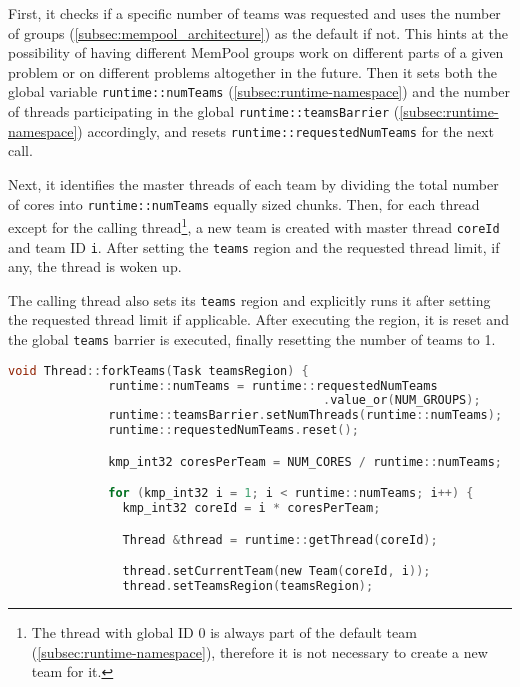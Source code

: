 \begin{itemize}
	      First, it checks if a specific number of teams was requested and uses the number of groups
	      (\cref{subsec:mempool_architecture}) as the default if not. This hints at the possibility
	      of having different MemPool groups work on different parts of a given problem or on
	      different problems altogether in the future. Then it sets both the global variable
	      \texttt{runtime::numTeams} (\cref{subsec:runtime-namespace}) and the number of threads
	      participating in the global \texttt{runtime::teamsBarrier}
	      (\cref{subsec:runtime-namespace}) accordingly, and resets
	      \texttt{runtime::requestedNumTeams} for the next call.

	      Next, it identifies the master threads of each team by dividing the total number of cores
	      into \texttt{runtime::numTeams} equally sized chunks. Then, for each thread except for the
	      calling thread\footnote{The thread with global ID 0 is always part of the default team
		      (\cref{subsec:runtime-namespace}), therefore it is not necessary to create a new team
		      for it.}, a new team is created with master thread \texttt{coreId} and team ID \texttt{i}.
	      After setting the \texttt{teams} region and the requested thread limit, if any, the thread
	      is woken up.

	      The calling thread also sets its \texttt{teams} region and explicitly runs it after
	      setting the requested thread limit if applicable. After executing the region, it is reset
	      and the global \texttt{teams} barrier is executed, finally resetting the number of teams
	      to 1.

	      \begin{lstlisting}[language=C, caption={void Thread::forkTeams},
          label={lst:thread-forkTeams},
          escapechar=@]
            void Thread::forkTeams(Task teamsRegion) {
              runtime::numTeams = runtime::requestedNumTeams
                                            .value_or(NUM_GROUPS);
              runtime::teamsBarrier.setNumThreads(runtime::numTeams);
              runtime::requestedNumTeams.reset();

              kmp_int32 coresPerTeam = NUM_CORES / runtime::numTeams;

              for (kmp_int32 i = 1; i < runtime::numTeams; i++) {
                kmp_int32 coreId = i * coresPerTeam;

                Thread &thread = runtime::getThread(coreId);

                thread.setCurrentTeam(new Team(coreId, i));
                thread.setTeamsRegion(teamsRegion);


\end{lstlisting}
\end{itemize}

